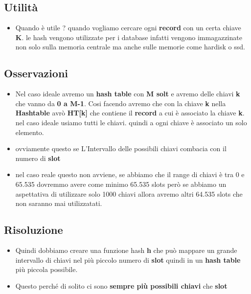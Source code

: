 \subsection{Utilità}
\begin{itemize}
    \item Quando è utile ? quando vogliamo cercare ogni \textbf{record} con un certa chiave \textbf{K}. le hash vengono utilizzate per i database infatti vengono immagazzinate non solo sulla memoria centrale ma anche sulle memorie come hardisk o ssd.
\end{itemize}

\subsection{Osservazioni}
\begin{itemize}
    \item Nel caso ideale avremo un \textbf{hash table} con \textbf{M solt} e avremo delle chiavi \textbf{k} che vanno da \textbf{0 a M-1}. Cosi facendo avremo che con la chiave \textbf{k} nella \textbf{Hashtable} avrò \textbf{HT[k]} che contiene il \textbf{record} a cui è associato la chiave \textbf{k}. nel caso ideale usiamo tutti le chiavi. quindi a ogni chiave è associato un solo elemento.
    
    \item ovviamente questo se L'Intervallo delle possibili chiavi combacia con il numero di \textbf{slot}
    
    \item nel caso reale questo non avviene, se abbiamo che il range di chiavi è tra 0 e 65.535 dovremmo avere come minimo 65.535 slots però se abbiamo un aspettativa di utilizzare solo 1000 chiavi allora avremo altri 64.535 slots che non saranno mai utilizzatati.
    
\end{itemize}

\subsection{Risoluzione}
\begin{itemize}
    \item Quindi dobbiamo creare una funzione hash \textbf{h} che può mappare un grande intervallo di chiavi nel più piccolo numero di \textbf{slot} quindi in un \textbf{hash table} più piccola possibile.
    \item Questo perché di solito ci sono \textbf{sempre più possibili chiavi} che \textbf{slot}
\end{itemize}
